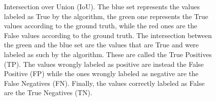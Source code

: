 \renewcommand{\floatpagefraction}{.8}%
\begin{figure}
    \caption{Intersection over Union (IoU). The blue set represents the values
    labeled as True by the algorithm, the green one represents the True values
    according to the ground truth, while the red ones are the False values
    according to the ground truth. The intersection between the green and the
    blue set are the values that are True and were labeled as such by the
    algorithm. These are called the True Positives (TP). The values wrongly
    labeled as positive are instead the False Positive (FP) while the ones
    wrongly labeled as negative are the False Negatives (FN). Finally, the
    values correctly labeled as False are the True Negatives (TN).}
\label{fig:iou}
\end{figure}

